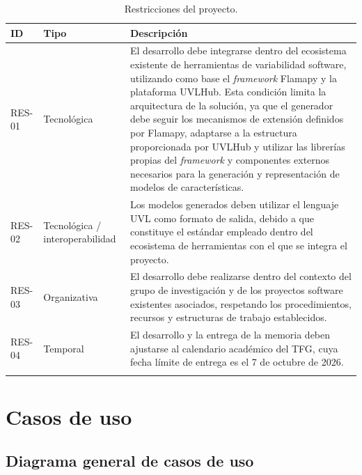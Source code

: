 \begin{longtable}{@{}P{1.4cm} P{3cm}
P{\dimexpr\textwidth-4.4cm-4\tabcolsep\relax}@{}}

\toprule
\textbf{ID} & \textbf{Tipo} & \textbf{Descripción} \\
\midrule
\endhead

RES-01 & Tecnológica &
El desarrollo debe integrarse dentro del ecosistema existente de herramientas de variabilidad software, utilizando como base el \textit{framework} Flamapy y la plataforma UVLHub. Esta condición limita la arquitectura de la solución, ya que el generador debe seguir los mecanismos de extensión definidos por Flamapy, adaptarse a la estructura proporcionada por UVLHub y utilizar las librerías propias del \textit{framework} y componentes externos necesarios para la generación y representación de modelos de características.
\\[0.8em]

RES-02 & Tecnológica / interoperabilidad &
Los modelos generados deben utilizar el lenguaje UVL como formato de salida, debido a que constituye el estándar empleado dentro del ecosistema de herramientas con el que se integra el proyecto.
\\[0.8em]

RES-03 & Organizativa &
El desarrollo debe realizarse dentro del contexto del grupo de investigación y de los proyectos software existentes asociados, respetando los procedimientos, recursos y estructuras de trabajo establecidos.
\\[0.8em]

RES-04 & Temporal &
El desarrollo y la entrega de la memoria deben ajustarse al calendario
académico del TFG, cuya fecha límite de entrega es el 7 de octubre
de 2026.
\\[0.8em]

\bottomrule

\caption{Restricciones del proyecto.}
\label{tab:res}
\end{longtable}

\section{Casos de uso}
\label{sec:casos_uso}

\subsection{Diagrama general de casos de uso}
\label{subsec:cu_diagrama}


